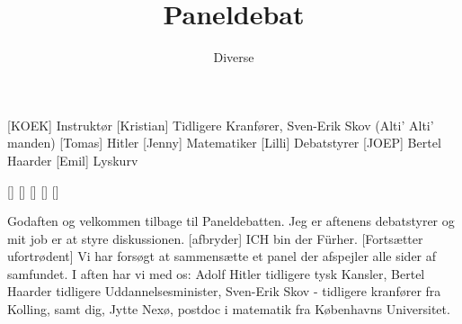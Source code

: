 \documentclass[a4paper,11pt]{article}
\title{Paneldebat}
\author{Diverse}
\begin{document}
\maketitle

\begin{roles}
[KOEK] Instruktør
[Kristian] Tidligere Kranfører, Sven-Erik Skov (Alti' Alti' manden)
[Tomas] Hitler
[Jenny] Matematiker
[Lilli] Debatstyrer
[JOEP] Bertel Haarder
[Emil] Lyskurv
\end{roles}

\begin{props}
[]
[]
[]
[]
[]
\end{props}


\begin{sketch}

\scene{}
 Godaften og velkommen tilbage til Paneldebatten. Jeg er aftenens debatstyrer og mit job er at styre diskussionen.
[afbryder] ICH bin der Fürher.
[Fortsætter ufortrødent] Vi har forsøgt at sammensætte et panel der afspejler alle sider af samfundet. I aften har vi med os: Adolf Hitler tidligere tysk Kansler, Bertel Haarder tidligere Uddannelsesminister, Sven-Erik Skov - tidligere kranfører fra Kolling, samt dig, Jytte Nexø, postdoc i matematik fra Københavns Universitet. 


\end{sketch}
\end{document}

